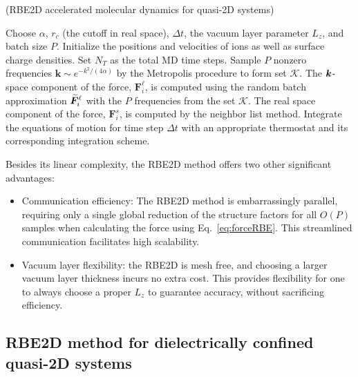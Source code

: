 \begin{algorithm}[ht]
 \caption{(RBE2D accelerated molecular dynamics for quasi-2D systems)}\label{Alg::1}
 \begin{algorithmic}[1]
  \State Choose $\alpha$, $r_c$ (the cutoff in real space), $\Delta t$, the vacuum layer parameter $L_z$, and batch size $P$. Initialize the positions and velocities of ions as well as surface charge densities. Set $N_T$ as the total MD time steps.
  \State Sample $P$ nonzero frequencies $\bm{k}\sim e^{-k^2/(4\alpha)}$ by the Metropolis procedure to form  set $\mathcal{K}$.
  \State The $\boldsymbol{k}$-space component of the force, $\bm{F}_i^{\ell}$, is computed using the random batch approximation $\widetilde{\boldsymbol{F}}_i^{\ell}$ with the $P$ frequencies from the set $\mathcal{K}$.
  \State The real space component of the force, $\bm{F}_i^{s}$, is computed by the neighbor list method. %
  \State Integrate the equations of motion for time step $\Delta t$ with an appropriate thermostat and its corresponding integration scheme. %
  
  \EndFor
 \end{algorithmic}
\end{algorithm}
Besides its linear complexity, the RBE2D method offers two other significant advantages:
\begin{itemize}
    \item  {Communication efficiency: The RBE2D method is embarrassingly parallel, requiring only a single global reduction of the structure factors for all $O(P)$ samples when calculating the force using Eq.~\eqref{eq:forceRBE}.} This streamlined communication facilitates high scalability. 

    \item Vacuum layer flexibility: the RBE2D is mesh free, and choosing a larger vacuum layer thickness incurs no extra cost. This provides flexibility for one to always choose a proper $L_z$ to guarantee accuracy, without sacrificing efficiency.
\end{itemize}

\subsection{RBE2D method for dielectrically confined quasi-2D systems} \label{subsec::IBCELCDielectric}

